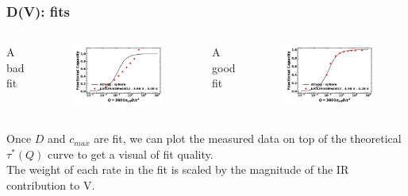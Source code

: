 \documentclass{beamer}
\begin{document}
\begin{frame}
\frametitle{D(V): fits}

\begin{columns}
	
	\centering A bad fit
	\vspace{-0.4cm}
	\begin{figure}
		\includegraphics[width=0.95\linewidth]{figs/Li112Ni44Mn44O2_Atlung-sphere_3300.jpg}
	\end{figure}
	
	\centering A good fit
	\vspace{-0.4cm}
	\begin{figure}
	\includegraphics[width=0.95\linewidth]{figs/Li112Ni44Mn44O2_Atlung-sphere_4250.jpg}
	\end{figure}
	
\end{columns}

Once $D$ and $c_{max}$ are fit, we can plot the measured data on top of the theoretical $\tau^*(Q)$ curve to get a visual of fit quality. \\
\vspace{\baselineskip}
The weight of each rate in the fit is scaled by the magnitude of the IR contribution to V. 

\end{frame}
\end{document}
